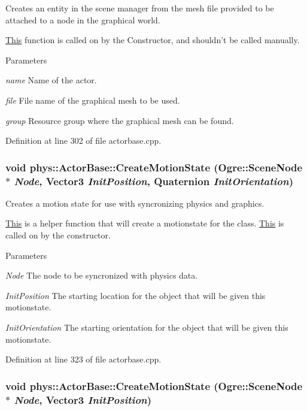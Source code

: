 Creates an entity in the scene manager from the mesh file provided to be attached to a node in the graphical world. \par
 \hyperlink{structThis}{This} function is called on by the Constructor, and shouldn't be called manually. 
\begin{DoxyParams}{Parameters}
\item[{\em name}]Name of the actor. \item[{\em file}]File name of the graphical mesh to be used. \item[{\em group}]Resource group where the graphical mesh can be found. \end{DoxyParams}


Definition at line 302 of file actorbase.cpp.

\hypertarget{classphys_1_1ActorBase_ae002dd16cd0d7d2c3d3098f85920ae02}{
\subsubsection[{CreateMotionState}]{\setlength{\rightskip}{0pt plus 5cm}void phys::ActorBase::CreateMotionState (Ogre::SceneNode $\ast$ {\em Node}, \/  {\bf Vector3} {\em InitPosition}, \/  {\bf Quaternion} {\em InitOrientation})}}
\label{d8/d0f/classphys_1_1ActorBase_ae002dd16cd0d7d2c3d3098f85920ae02}


Creates a motion state for use with syncronizing physics and graphics. 

\hyperlink{structThis}{This} is a helper function that will create a motionstate for the class. \hyperlink{structThis}{This} is called on by the constructor. 
\begin{DoxyParams}{Parameters}
\item[{\em Node}]The node to be syncronized with physics data. \item[{\em InitPosition}]The starting location for the object that will be given this motionstate. \item[{\em InitOrientation}]The starting orientation for the object that will be given this motionstate. \end{DoxyParams}


Definition at line 323 of file actorbase.cpp.

\hypertarget{classphys_1_1ActorBase_a5bc2f834d7994c3c6a9408f4ff699f59}{
\subsubsection[{CreateMotionState}]{\setlength{\rightskip}{0pt plus 5cm}void phys::ActorBase::CreateMotionState (Ogre::SceneNode $\ast$ {\em Node}, \/  {\bf Vector3} {\em InitPosition})}}
\label{d8/d0f/classphys_1_1ActorBase_a5bc2f834d7994c3c6a9408f4ff699f59}


